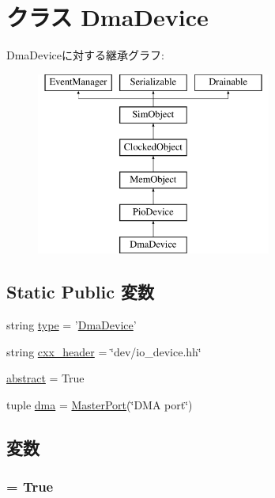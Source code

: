 \hypertarget{classDevice_1_1DmaDevice}{
\section{クラス DmaDevice}
\label{classDevice_1_1DmaDevice}
}
DmaDeviceに対する継承グラフ:\begin{figure}[H]
\begin{center}
\leavevmode
\includegraphics[height=6cm]{classDevice_1_1DmaDevice}
\end{center}
\end{figure}
\subsection*{Static Public 変数}
\begin{DoxyCompactItemize}
\item 
string \hyperlink{classDevice_1_1DmaDevice_acce15679d830831b0bbe8ebc2a60b2ca}{type} = '\hyperlink{classDevice_1_1DmaDevice}{DmaDevice}'
\item 
string \hyperlink{classDevice_1_1DmaDevice_a17da7064bc5c518791f0c891eff05fda}{cxx\_\-header} = \char`\"{}dev/io\_\-device.hh\char`\"{}
\item 
\hyperlink{classDevice_1_1DmaDevice_a17fa61ac3806b481cafee5593b55e5d0}{abstract} = True
\item 
tuple \hyperlink{classDevice_1_1DmaDevice_abdac2228870fba23068128b66c85f31f}{dma} = \hyperlink{classm5_1_1params_1_1MasterPort}{MasterPort}(\char`\"{}DMA port\char`\"{})
\end{DoxyCompactItemize}


\subsection{変数}
\hypertarget{classDevice_1_1DmaDevice_a17fa61ac3806b481cafee5593b55e5d0}{
\subsubsection[{abstract}]{ = True}}
\label{classDevice_1_1DmaDevice_a17fa61ac3806b481cafee5593b55e5d0}


